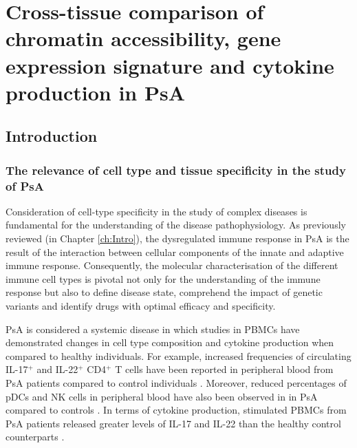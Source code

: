 \chapter{Cross-tissue comparison of chromatin accessibility, gene expression signature and cytokine production in PsA}
\label{ch:Results3}



\section{Introduction}

\subsection{The relevance of cell type and tissue specificity in the study of PsA}

Consideration of cell-type specificity in the study of complex diseases is fundamental for the understanding of the disease pathophysiology. As previously reviewed (in Chapter \ref{ch:Intro}), the dysregulated immune response in PsA is the result of the interaction between cellular components of the innate and adaptive immune response. Consequently, the molecular characterisation of the different immune cell types is pivotal not only for the understanding of the immune response but also to define disease state, comprehend the impact of genetic variants and identify drugs with optimal efficacy and specificity.

PsA is considered a systemic disease in which studies in PBMCs have demonstrated changes in cell type composition and cytokine production when compared to healthy individuals. For example, increased frequencies of circulating IL-17$^+$ and IL-22$^+$ CD4$^+$ T cells have been reported in peripheral blood from PsA patients compared to control individuals \parencite{Benham2013}. Moreover, reduced percentages of pDCs and NK cells in peripheral blood have also been observed in in PsA compared to controls \parencite{Jongbloed2006, Spadaro2004}. In terms of cytokine production, stimulated PBMCs from PsA patients released greater levels of IL-17 and IL-22 than the healthy control counterparts \parencite{Benham2013}. 

